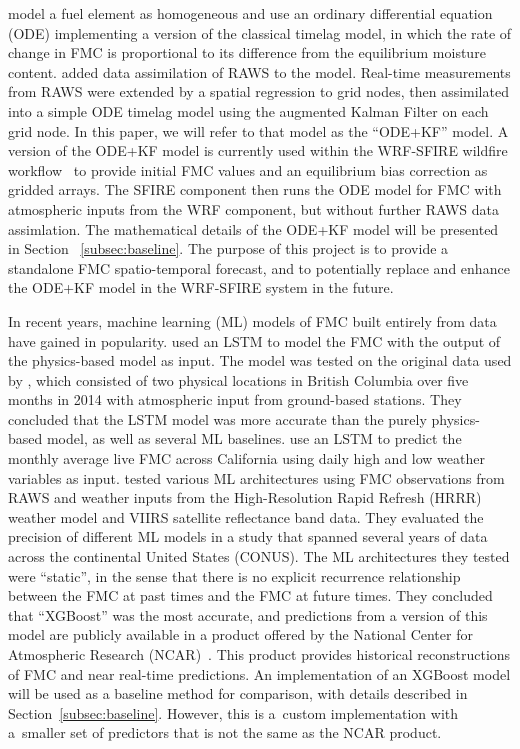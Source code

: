 \documentclass[fire,article,submit,pdftex,moreauthors]{Definitions/mdpi}
\begin{document}
\citet{Mandel-2014-RAA} model a fuel element as homogeneous and use an ordinary differential equation (ODE) implementing a version of the classical timelag model, in which the rate of change in FMC is proportional to its difference from the equilibrium moisture content. 
\citet{Vejmelka-2014-DAF} added data assimilation of RAWS to the model. Real-time measurements from RAWS were extended by a spatial regression to grid nodes, then assimilated into a simple ODE timelag model using the augmented Kalman Filter on each grid node. In this paper, we will refer to that model as the ``ODE+KF'' model. A version of the ODE+KF model is currently used within the WRF-SFIRE wildfire workflow~\citep{Mandel-2019-IDH} to provide initial FMC values and an equilibrium bias correction as gridded arrays. The SFIRE component then runs the ODE model for FMC with atmospheric inputs from the WRF component, but without further RAWS data assimlation.  The mathematical details of the ODE+KF model will be presented in Section ~\ref{subsec:baseline}. The purpose of this project is to provide a standalone FMC spatio-temporal forecast, and to potentially replace and enhance the ODE+KF model in the WRF-SFIRE system in the future.

In recent years, machine learning (ML) models of FMC built entirely from data have gained in popularity. \citet{Fan-2021-PGD} used an LSTM to model the FMC with the output of the \citet{vanderKamp-2017-MFS} physics-based model as input. The model was tested on the original data used by \citet{vanderKamp-2017-MFS}, which consisted of two physical locations in British Columbia over five months in 2014 with atmospheric input from ground-based stations. They concluded that the LSTM model was more accurate than the purely physics-based model, as well as several ML baselines. \citet{Kang-2022-FMC} use an LSTM to predict the monthly average live FMC across California using daily high and low weather variables as input. \citet{Schreck-2023-MLV} tested various ML architectures using FMC observations from RAWS and weather inputs from the High-Resolution Rapid Refresh (HRRR) weather model and VIIRS satellite reflectance band data. They evaluated the precision of different ML models in a study that spanned several years of data across the continental United States (CONUS). The ML architectures they tested were ``static'', in the sense that there is no explicit recurrence relationship between the FMC at past times and the FMC at future times. They concluded that ``XGBoost'' was the most accurate, and predictions from a version of this model are publicly available in a product offered by the National Center for Atmospheric Research (NCAR)~\citep{NCAR-2025-FMC}. This product provides historical reconstructions of FMC and near real-time predictions. An implementation of an XGBoost model will be used as a baseline method for comparison, with details described in Section~\ref{subsec:baseline}. However, this is a~custom implementation with a~smaller set of predictors that is not the same as the NCAR product. 
\end{document}
